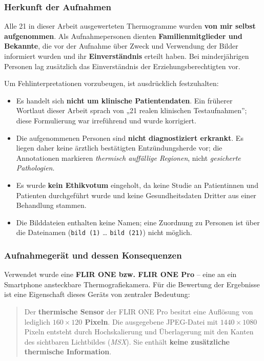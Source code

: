\documentclass[
  11pt,
]{article}
\providecommand{\tightlist}{%
  \setlength{\itemsep}{0pt}\setlength{\parskip}{0pt}}
\begin{document}
\subsubsection{Herkunft der Aufnahmen}\label{herkunft-der-aufnahmen}

Alle 21 in dieser Arbeit ausgewerteten Thermogramme wurden \textbf{von
mir selbst aufgenommen}. Als Aufnahmepersonen dienten
\textbf{Familienmitglieder und Bekannte}, die vor der Aufnahme über
Zweck und Verwendung der Bilder informiert wurden und ihr
\textbf{Einverständnis} erteilt haben. Bei minderjährigen Personen lag
zusätzlich das Einverständnis der Erziehungsberechtigten vor.

Um Fehlinterpretationen vorzubeugen, ist ausdrücklich festzuhalten:

\begin{itemize}
\tightlist
\item
  Es handelt sich \textbf{nicht um klinische Patientendaten}. Ein
  früherer Wortlaut dieser Arbeit sprach von „21 realen klinischen
  Testaufnahmen''; diese Formulierung war irreführend und wurde
  korrigiert.
\item
  Die aufgenommenen Personen sind \textbf{nicht diagnostiziert
  erkrankt}. Es liegen daher keine ärztlich bestätigten Entzündungsherde
  vor; die Annotationen markieren \emph{thermisch auffällige Regionen},
  nicht \emph{gesicherte Pathologien}.
\item
  Es wurde \textbf{kein Ethikvotum} eingeholt, da keine Studie an
  Patientinnen und Patienten durchgeführt wurde und keine
  Gesundheitsdaten Dritter aus einer Behandlung stammen.
\item
  Die Bilddateien enthalten keine Namen; eine Zuordnung zu Personen ist
  über die Dateinamen (\texttt{bild\ (1)} \ldots{} \texttt{bild\ (21)})
  nicht möglich.
\end{itemize}

\subsubsection{Aufnahmegerät und dessen
Konsequenzen}\label{aufnahmegeruxe4t-und-dessen-konsequenzen}

Verwendet wurde eine \textbf{FLIR ONE bzw. FLIR ONE Pro} -- eine an ein
Smartphone ansteckbare Thermografiekamera. Für die Bewertung der
Ergebnisse ist eine Eigenschaft dieses Geräts von zentraler Bedeutung:

\begin{quote}
Der \textbf{thermische Sensor} der FLIR ONE Pro besitzt eine Auflösung
von lediglich \textbf{\(160 \times 120\) Pixeln}. Die ausgegebene
JPEG-Datei mit \(1440 \times 1080\) Pixeln entsteht durch Hochskalierung
und Überlagerung mit den Kanten des sichtbaren Lichtbildes (\emph{MSX}).
Sie enthält \textbf{keine zusätzliche thermische Information}.
\end{quote}
\end{document}
